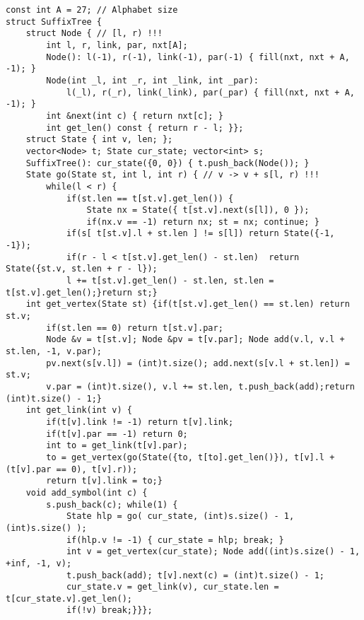 \documentclass[12pt]{article}
\begin{document}
\begin{verbatim}
const int A = 27; // Alphabet size
struct SuffixTree {
    struct Node { // [l, r) !!!
        int l, r, link, par, nxt[A];
        Node(): l(-1), r(-1), link(-1), par(-1) { fill(nxt, nxt + A, -1); }
        Node(int _l, int _r, int _link, int _par): 
            l(_l), r(_r), link(_link), par(_par) { fill(nxt, nxt + A, -1); }
        int &next(int c) { return nxt[c]; }
        int get_len() const { return r - l; }};
    struct State { int v, len; };
    vector<Node> t; State cur_state; vector<int> s;
    SuffixTree(): cur_state({0, 0}) { t.push_back(Node()); }
    State go(State st, int l, int r) { // v -> v + s[l, r) !!!
        while(l < r) {
            if(st.len == t[st.v].get_len()) {
                State nx = State({ t[st.v].next(s[l]), 0 });
                if(nx.v == -1) return nx; st = nx; continue; }
            if(s[ t[st.v].l + st.len ] != s[l]) return State({-1, -1});
            if(r - l < t[st.v].get_len() - st.len)  return State({st.v, st.len + r - l});
            l += t[st.v].get_len() - st.len, st.len = t[st.v].get_len();}return st;}
    int get_vertex(State st) {if(t[st.v].get_len() == st.len) return st.v;
        if(st.len == 0) return t[st.v].par;
        Node &v = t[st.v]; Node &pv = t[v.par]; Node add(v.l, v.l + st.len, -1, v.par);
        pv.next(s[v.l]) = (int)t.size(); add.next(s[v.l + st.len]) = st.v;
        v.par = (int)t.size(), v.l += st.len, t.push_back(add);return (int)t.size() - 1;}
    int get_link(int v) {
        if(t[v].link != -1) return t[v].link;
        if(t[v].par == -1) return 0;
        int to = get_link(t[v].par);
        to = get_vertex(go(State({to, t[to].get_len()}), t[v].l + (t[v].par == 0), t[v].r));
        return t[v].link = to;}
    void add_symbol(int c) {
        s.push_back(c); while(1) {
            State hlp = go( cur_state, (int)s.size() - 1, (int)s.size() );
            if(hlp.v != -1) { cur_state = hlp; break; }
            int v = get_vertex(cur_state); Node add((int)s.size() - 1, +inf, -1, v);
            t.push_back(add); t[v].next(c) = (int)t.size() - 1;
            cur_state.v = get_link(v), cur_state.len = t[cur_state.v].get_len();
            if(!v) break;}}};
\end{verbatim}
\end{document}
